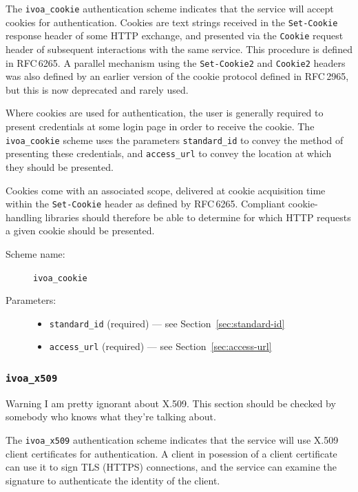 \documentclass[11pt,a4paper]{ivoa}
\newcommand{\rfc}[1]{RFC\,#1}
\begin{document}
The \verb|ivoa_cookie| authentication scheme indicates that the service
will accept cookies for authentication.
Cookies are text strings received in the {\tt Set-Cookie}
response header of some HTTP exchange,
and presented via the {\tt Cookie} request header of subsequent
interactions with the same service.
This procedure is defined in \rfc{6265}.
A parallel mechanism using the {\tt Set-Cookie2} and {\tt Cookie2}
headers was also defined by an earlier version of the cookie protocol
defined in \rfc{2965}, but this is now deprecated and rarely used.

Where cookies are used for authentication, the user is generally required
to present credentials at some login page in order to receive the cookie.
The \verb|ivoa_cookie| scheme uses the parameters 
\verb|standard_id| to convey the method of presenting these credentials, and
\verb|access_url| to convey the location at which they should be presented.

Cookies come with an associated scope,
delivered at cookie acquisition time within the {\tt Set-Cookie} header
as defined by \rfc{6265}.
Compliant cookie-handling libraries should therefore be able to determine
for which HTTP requests a given cookie should be presented.

\begin{description}
  \item[Scheme name:] \verb|ivoa_cookie|
  \item[Parameters:] \mbox{}
  \begin{itemize}
    \item \verb|standard_id| (required) --- see Section~\ref{sec:standard-id}
    \item \verb|access_url| (required) --- see Section~\ref{sec:access-url}
  \end{itemize}
\end{description}


\subsubsection{\mbox{\tt ivoa\_x509}}\label{sec:ivoa-x509}

\begin{admonition}{Warning}
  I am pretty ignorant about X.509.
  This section should be checked by
  somebody who knows what they're talking about.
\end{admonition}

The \verb|ivoa_x509| authentication scheme indicates that the
service will use X.509 client certificates for authentication.
A client in posession of a client certificate can use it to
sign TLS (HTTPS) connections, and the service can examine the signature
to authenticate the identity of the client.
\end{document}
